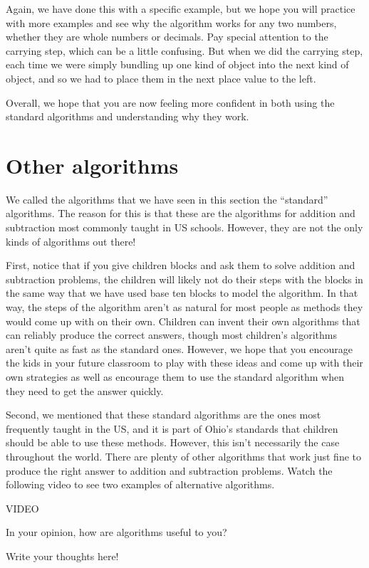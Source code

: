 \documentclass{ximera}
\begin{document}
Again, we have done this with a specific example, but we hope you will practice with more examples and see why the algorithm works for any two numbers, whether they are whole numbers or decimals. Pay special attention to the carrying step, which can be a little confusing. But when we did the carrying step, each time we were simply bundling up one kind of object into the next kind of object, and so we had to place them in the next place value to the left.

Overall, we hope that you are now feeling more confident in both using the standard algorithms and understanding why they work.





\section{Other algorithms}

We called the algorithms that we have seen in this section the ``standard'' algorithms. The reason for this is that these are the algorithms for addition and subtraction most commonly taught in US schools. However, they are not the only kinds of algorithms out there!

First, notice that if you give children blocks and ask them to solve addition and subtraction problems, the children will likely not do their steps with the blocks in the same way that we have used base ten blocks to model the algorithm. In that way, the steps of the algorithm aren't as natural for most people as methods they would come up with on their own. Children can invent their own algorithms that can reliably produce the correct answers, though most children's algorithms aren't quite as fast as the standard ones. However, we hope that you encourage the kids in your future classroom to play with these ideas and come up with their own strategies as well as encourage them to use the standard algorithm when they need to get the answer quickly.

Second, we mentioned that these standard algorithms are the ones most frequently taught in the US, and it is part of Ohio's standards that children should be able to use these methods. However, this isn't necessarily the case throughout the world. There are plenty of other algorithms that work just fine to produce the right answer to addition and subtraction problems. Watch the following video to see two examples of alternative algorithms.

VIDEO

\begin{question}
In your opinion, how are algorithms useful to you?
\begin{freeResponse}
Write your thoughts here!
\end{freeResponse}
\end{question}
\end{document}
